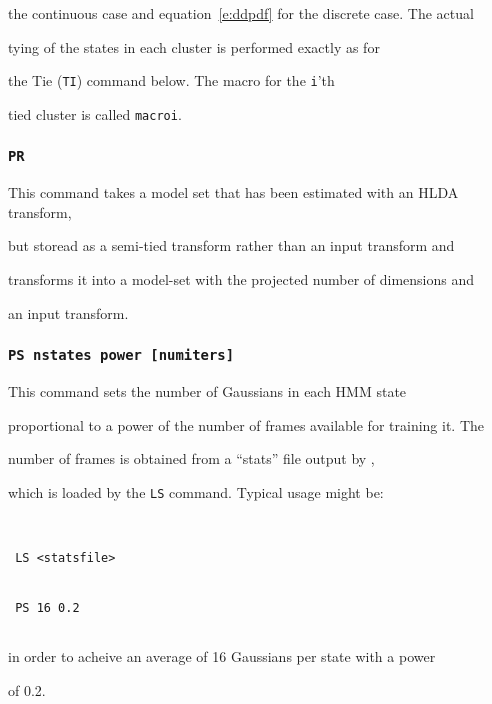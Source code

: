 the continuous case and equation~\ref{e:ddpdf} for the discrete case.  The actual


tying of the states in each cluster is performed exactly as for


the Tie (\texttt{TI}) command below.  The macro for the \texttt{i}'th


tied cluster is called \texttt{macroi}.





\subsubsection*{\tt PR }





This command takes a model set that has been estimated with an HLDA transform,


but storead as a semi-tied transform rather than an input transform and 


transforms it into a model-set with the projected number of dimensions and


an input transform.





\subsubsection*{\tt PS nstates power [numiters]   }





This command sets the number of Gaussians in each HMM state


proportional to a power of the number of frames available for training it.  The


number of frames is obtained from a ``stats'' file output by ,


which is loaded by the \texttt{LS} command.  Typical usage might be:


\begin{verbatim}


 LS <statsfile> 


 PS 16 0.2 


\end{verbatim}


in order to acheive an average of 16 Gaussians per state with a power


of 0.2.  





